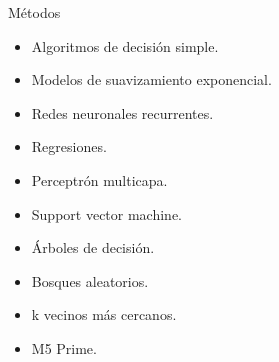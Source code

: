\documentclass[aspectratio=169]{beamer}
\begin{document}
    
 \begin{frame}{}
 	 \begin{block}{Métodos}
 		\begin{itemize}
 			\item Algoritmos de decisión simple.
 			\item Modelos de suavizamiento exponencial.
 			\item Redes neuronales recurrentes.
 			\item Regresiones.
 			\item Perceptrón multicapa.
 			\item Support vector machine.
 			\item Árboles de decisión.
 			\item Bosques aleatorios.
 			\item k vecinos más cercanos.
 			\item M5 Prime.
 		\end{itemize}
 	\end{block}
 \end{frame}
\end{document}
